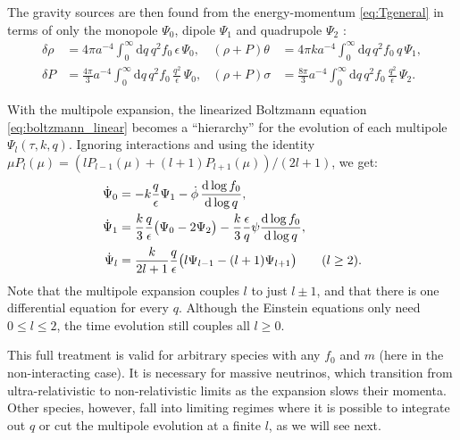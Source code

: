 \documentclass[USenglish, thumbmarks]{uiophdthesis} %
\newcommand\diff{\mathrm{d}}
\begin{document}
The gravity sources
are then found from the energy-momentum \eqref{eq:Tgeneral}
in terms of only the monopole $\Psi_0$, dipole $\Psi_1$ and quadrupole $\Psi_2$
\cite[equation (55)]{maCosmologicalPerturbationTheory1995a}:
\begin{subequations}
\label{eq:energy_momentum_integrals_pert}
\begin{align}
\delta\rho &= 4\pi a^{-4} \int_0^\infty \diff{q}\,q^2 f_0 \, \epsilon \, \Psi_0, &
(\rho + P)\theta &= 4\pi k a^{-4} \int_0^\infty \diff{q}\,q^2 f_0 \, q \, \Psi_1, \\
\delta P &= \frac{4\pi}{3} a^{-4} \int_0^\infty \diff{q}\,q^2 f_0 \, \frac{q^2}{\epsilon} \, \Psi_0, &
(\rho + P)\sigma &= \frac{8\pi}{3} a^{-4} \int_0^\infty \diff{q}\,q^2 f_0 \, \frac{q^2}{\epsilon} \, \Psi_2 .
\end{align}
\end{subequations}

With the multipole expansion, the linearized Boltzmann equation \eqref{eq:boltzmann_linear}
becomes a \enquote{hierarchy} for the evolution of each multipole $\Psi_l(\tau, k, q)$.
Ignoring interactions and using the identity $\mu P_l(\mu) = (l P_{l-1}(\mu) + (l+1) P_{l+1}(\mu)) / (2l+1)$,
we get:
\begin{subequations}
\label{eq:hierarchy_ql}
\begin{align}
\dot{\Psi}_0 &= -k \frac{q}{\epsilon} \Psi_1 - \dot{\phi}\,\odv{\log f_0}{\log q} , \\
\dot{\Psi}_1 &= \frac{k}{3} \frac{q}{\epsilon} \big(\Psi_0 - 2\Psi_2\big) - \frac{k}{3} \frac{\epsilon}{q} \psi \odv{\log f_0}{\log q} , \\
\dot{\Psi}_l &= \frac{k}{2l+1} \frac{q}{\epsilon}\big(l \Psi_{l-1} - (l+1) \Psi_{l+1}\big) \qquad (l \geq 2) .
\end{align}
\end{subequations}
Note that the multipole expansion couples $l$ to just $l \pm 1$,
and that there is one differential equation for every $q$.
Although the Einstein equations only need $0 \leq l \leq 2$,
the time evolution still couples all $l \geq 0$.

This full treatment is valid for arbitrary species with any $f_0$ and $m$
(here in the non-interacting case).
It is necessary for massive neutrinos, which transition from ultra-relativistic to non-relativistic limits
as the expansion slows their momenta.
Other species, however, fall into limiting regimes where it is possible to integrate out $q$ or cut the multipole evolution at a finite $l$,
as we will see next.
\end{document}
